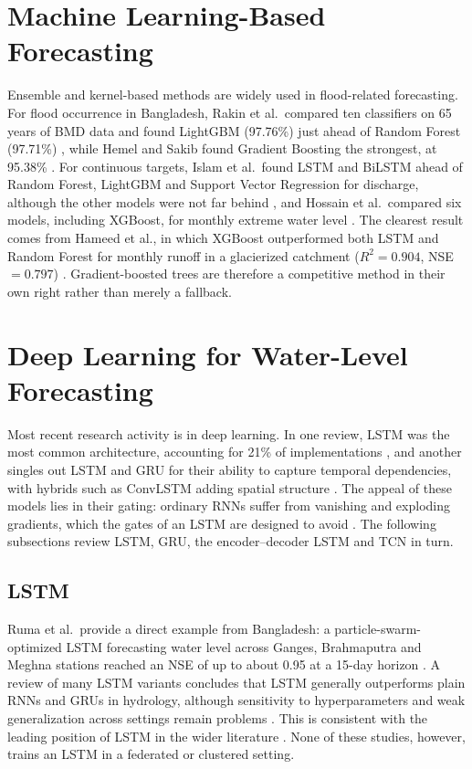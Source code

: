 \section{Machine Learning-Based Forecasting}
\label{sec:2.5}

Ensemble and kernel-based methods are widely used in flood-related
forecasting. For flood occurrence in Bangladesh, Rakin et al.\ compared ten
classifiers on 65 years of BMD data and found LightGBM (97.76\%) just ahead of
Random Forest (97.71\%) \cite{Rakin2023}, while Hemel and Sakib found Gradient
Boosting the strongest, at 95.38\% \cite{HemelSakib2024}. For continuous
targets, Islam et al.\ found LSTM and BiLSTM ahead of Random Forest, LightGBM
and Support Vector Regression for discharge, although the other models were
not far behind \cite{Islam2026a}, and Hossain et al.\ compared six models,
including XGBoost, for monthly extreme water level \cite{Hossain2025}. The
clearest result comes from Hameed et al., in which XGBoost outperformed both
LSTM and Random Forest for monthly runoff in a glacierized catchment
($R^2 = 0.904$, NSE $= 0.797$) \cite{Hameed2025}. Gradient-boosted trees are
therefore a competitive method in their own right rather than merely a
fallback.

\section{Deep Learning for Water-Level Forecasting}
\label{sec:2.6}

Most recent research activity is in deep learning. In one review, LSTM was the
most common architecture, accounting for 21\% of implementations
\cite{Aghenda2025}, and another singles out LSTM and GRU for their ability to
capture temporal dependencies, with hybrids such as ConvLSTM adding spatial
structure \cite{Kumar2023}. The appeal of these models lies in their gating:
ordinary RNNs suffer from vanishing and exploding gradients, which the gates
of an LSTM are designed to avoid \cite{Waqas2024}. The following subsections
review LSTM, GRU, the encoder--decoder LSTM and TCN in turn.

\subsection{LSTM}
\label{sec:2.6.1}

Ruma et al.\ provide a direct example from Bangladesh: a
particle-swarm-optimized LSTM forecasting water level across Ganges,
Brahmaputra and Meghna stations reached an NSE of up to about 0.95 at a 15-day
horizon \cite{Ruma2023}. A review of many LSTM variants concludes that LSTM
generally outperforms plain RNNs and GRUs in hydrology, although sensitivity to
hyperparameters and weak generalization across settings remain problems
\cite{Waqas2024}. This is consistent with the leading position of LSTM in the
wider literature \cite{Aghenda2025}. None of these studies, however, trains an
LSTM in a federated or clustered setting.

